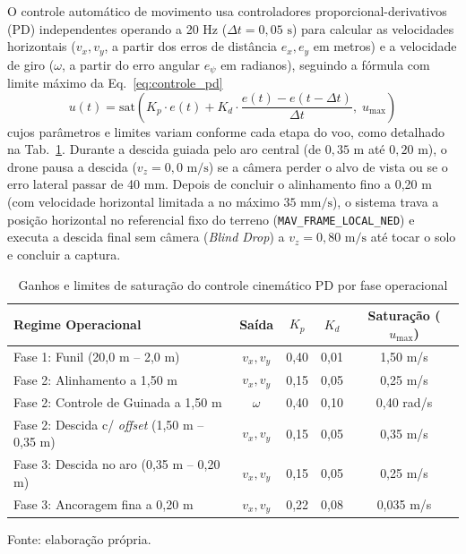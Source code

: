 O controle automático de movimento usa controladores proporcional-derivativos (PD) independentes operando a 20 Hz ($\Delta t = 0{,}05\text{ s}$) para calcular as velocidades horizontais ($v_x, v_y$, a partir dos erros de distância $e_x, e_y$ em metros) e a velocidade de giro ($\omega$, a partir do erro angular $e_\psi$ em radianos), seguindo a fórmula com limite máximo da Eq.~\ref{eq:controle_pd}
\begin{equation}
	u(t) = \text{sat}\left(K_p \cdot e(t) + K_d \cdot \frac{e(t) - e(t - \Delta t)}{\Delta t},\; u_{\max}\right)
	\label{eq:controle_pd}
\end{equation}
cujos parâmetros e limites variam conforme cada etapa do voo, como detalhado na Tab.~\ref{tab:ganhos_controle_pd}. Durante a descida guiada pelo aro central (de $0{,}35\text{ m}$ até $0{,}20\text{ m}$), o drone pausa a descida ($v_z = 0{,}0\text{ m/s}$) se a câmera perder o alvo de vista ou se o erro lateral passar de 40 mm. Depois de concluir o alinhamento fino a 0,20 m (com velocidade horizontal limitada a no máximo $35\text{ mm/s}$), o sistema trava a posição horizontal no referencial fixo do terreno (\texttt{MAV\_FRAME\_LOCAL\_NED}) e executa a descida final sem câmera (\textit{Blind Drop}) a $v_z = 0{,}80\text{ m/s}$ até tocar o solo e concluir a captura.

\begin{table}[H]
	\centering
	\small
	\setlength{\tabcolsep}{5pt}
	\captionsetup{justification=centering}
	\caption{Ganhos e limites de saturação do controle cinemático PD por fase operacional}
	\label{tab:ganhos_controle_pd}
	\vspace{0.2cm}
	\begin{tabular}{lcccc}
		\hline
		\textbf{Regime Operacional} & \textbf{Saída} & \textbf{$K_p$} & \textbf{$K_d$} & \textbf{Saturação ($u_{\max}$)} \\
		\hline
		Fase 1: Funil (20,0 m -- 2,0 m)                & $v_x, v_y$ & 0,40 & 0,01 & 1,50 m/s \\
		Fase 2: Alinhamento a 1,50 m                   & $v_x, v_y$ & 0,15 & 0,05 & 0,25 m/s \\
		Fase 2: Controle de Guinada a 1,50 m           & $\omega$   & 0,40 & 0,10 & 0,40 rad/s \\
		Fase 2: Descida c/ \textit{offset} (1,50 m -- 0,35 m)   & $v_x, v_y$ & 0,15 & 0,05 & 0,35 m/s \\
		Fase 3: Descida no aro (0,35 m -- 0,20 m)      & $v_x, v_y$ & 0,15 & 0,05 & 0,25 m/s \\
		Fase 3: Ancoragem fina a 0,20 m                & $v_x, v_y$ & 0,22 & 0,08 & 0,035 m/s \\
		\hline
	\end{tabular}
	\vspace{0.2cm}
	\begin{flushleft}
		\footnotesize Fonte: elaboração própria.
	\end{flushleft}
\end{table}

